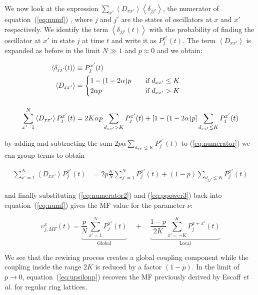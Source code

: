 We now look at the expression $\sum_{x'} \left< D_{xx'} \right> \left< \delta_{jj'} \right>$, the numerator of equation~(\ref{eq:numf})
, where $j$ and $j'$ are the states of oscillators at $x$ and $x'$ respectively. We identify the term $\left< \delta_{jj'}(t) \right>$
with the probability of finding the oscillator at $x'$ in state $j$ at time $t$ and write it as $P^{x'}_j(t)$. The term $\left< D_{xx'}
\right>$ is expanded as before in the limit $N \gg 1$ and $p \approx 0$ and we obtain:

\begin{align}
    \left< \delta_{jj'}(t) \right> &\equiv P_j^{x'}(t) \notag\\
    \left< D_{xx'} \right> &=
    \begin{cases}
        1-(1-2\alpha)p \quad &\text{if $d_{xx'} \leq K$}\\
        2\alpha p \quad &\text{if $d_{xx'} > K$}\\
    \end{cases} \notag\\[12pt]
    \sum_{x'=1}^N \left< D_{xx'} \right> P_j^{x'}(t) &= 2K\alpha p \sum_{d_{xx'}>K}P_j^{x'}(t) + [1-(1-2\alpha)p]\sum_{d_{xx'}\leq K} P_j^{x'}(t)
    \label{eq:numerator}
\end{align}

\noindent by adding and subtracting the sum $2p\alpha\sum_{d_{xx'} \leq K}P^{x'}_j(t)$ to (\ref{eq:numerator}) we can group terms to
obtain

\begin{align}
    \sum_{x'=1}^N \left< D_{xx'} \right> P_j^{x'}(t) &= 2p\frac{K}{N}\sum_{j'=1}^N P^{x'}_j(t) + (1-p)\sum_{d_{jj'} \leq K} P^{x'}_j(t)
    \label{eq:numerator2}
\end{align}

\noindent and finally substituting (\ref{eq:numerator2}) and (\ref{eq:ppower3}) back into equation~(\ref{eq:numf}) gives the MF value
for the parameter $\nu$:

\begin{equation}
    \upsilon_{j,MF}^x(t) = \underbrace{\frac{p}{N}\sum_{x'=1}^N P^{x'}_j(t)}_{\text{Global}}
\quad + \quad \underbrace{\frac{1-p}{2K}\sum_{x'=-K}^K P^{x+x'}_j(t)}_{\text{Local}}
    \label{eq:upsilonp}
\end{equation}

We see that the rewiring process creates a global coupling component while the coupling inside the range $2K$ is reduced by a factor
$(1-p)$. In the limit of $p\to 0$, equation~(\ref{eq:upsilonp}) recovers the MF previously derived by Escaff \textit{et al.} for
regular ring lattices\cite{escaff2014arrays}.

